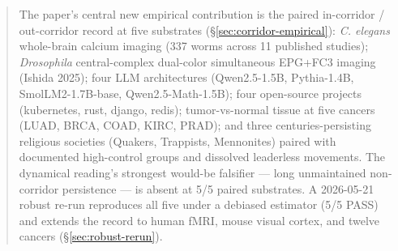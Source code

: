 \documentclass[11pt,a4paper]{article}
\begin{document}
\begin{abstract}
The paper's central new empirical contribution is the paired in-corridor / out-corridor record at five substrates (\S\ref{sec:corridor-empirical}): \textit{C. elegans} whole-brain calcium imaging (337 worms across 11 published studies); \textit{Drosophila} central-complex dual-color simultaneous EPG+FC3 imaging (Ishida 2025); four LLM architectures (Qwen2.5-1.5B, Pythia-1.4B, SmolLM2-1.7B-base, Qwen2.5-Math-1.5B); four open-source projects (kubernetes, rust, django, redis); tumor-vs-normal tissue at five cancers (LUAD, BRCA, COAD, KIRC, PRAD); and three centuries-persisting religious societies (Quakers, Trappists, Mennonites) paired with documented high-control groups and dissolved leaderless movements. The dynamical reading's strongest would-be falsifier --- long unmaintained non-corridor persistence --- is absent at 5/5 paired substrates. A 2026-05-21 robust re-run reproduces all five under a debiased estimator (5/5 PASS) and extends the record to human fMRI, mouse visual cortex, and twelve cancers (\S\ref{sec:robust-rerun}).



\end{abstract}
\end{document}
